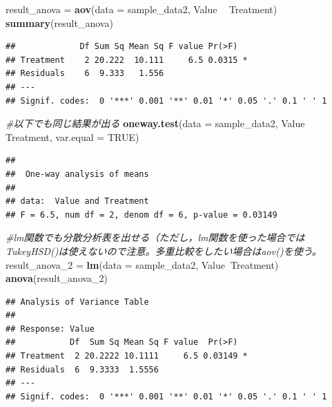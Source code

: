 \documentclass[]{article}
\newenvironment{Shaded}{\begin{snugshade}}{\end{snugshade}}
\newcommand{\KeywordTok}[1]{\textcolor[rgb]{0.13,0.29,0.53}{\textbf{#1}}}
\newcommand{\DataTypeTok}[1]{\textcolor[rgb]{0.13,0.29,0.53}{#1}}
\newcommand{\DecValTok}[1]{\textcolor[rgb]{0.00,0.00,0.81}{#1}}
\newcommand{\StringTok}[1]{\textcolor[rgb]{0.31,0.60,0.02}{#1}}
\newcommand{\CommentTok}[1]{\textcolor[rgb]{0.56,0.35,0.01}{\textit{#1}}}
\newcommand{\OtherTok}[1]{\textcolor[rgb]{0.56,0.35,0.01}{#1}}
\newcommand{\OperatorTok}[1]{\textcolor[rgb]{0.81,0.36,0.00}{\textbf{#1}}}
\newcommand{\NormalTok}[1]{#1}
\begin{document}
\begin{Shaded}
\begin{Highlighting}[]
\NormalTok{result_anova =}\StringTok{ }\KeywordTok{aov}\NormalTok{(}\DataTypeTok{data =}\NormalTok{ sample_data2, Value }\OperatorTok{~}\StringTok{ }\NormalTok{Treatment)}
\KeywordTok{summary}\NormalTok{(result_anova)}
\end{Highlighting}
\end{Shaded}

\begin{verbatim}
##             Df Sum Sq Mean Sq F value Pr(>F)  
## Treatment    2 20.222  10.111     6.5 0.0315 *
## Residuals    6  9.333   1.556                 
## ---
## Signif. codes:  0 '***' 0.001 '**' 0.01 '*' 0.05 '.' 0.1 ' ' 1
\end{verbatim}

\begin{Shaded}
\begin{Highlighting}[]
\CommentTok{#以下でも同じ結果が出る}
\KeywordTok{oneway.test}\NormalTok{(}\DataTypeTok{data =}\NormalTok{ sample_data2, Value }\OperatorTok{~}\StringTok{ }\NormalTok{Treatment, }\DataTypeTok{var.equal =} \OtherTok{TRUE}\NormalTok{)}
\end{Highlighting}
\end{Shaded}

\begin{verbatim}
## 
##  One-way analysis of means
## 
## data:  Value and Treatment
## F = 6.5, num df = 2, denom df = 6, p-value = 0.03149
\end{verbatim}

\begin{Shaded}
\begin{Highlighting}[]
\CommentTok{#lm関数でも分散分析表を出せる（ただし，lm関数を使った場合ではTukeyHSD()は使えないので注意。多重比較をしたい場合はaov()を使う。}
\NormalTok{result_anova_}\DecValTok{2}\NormalTok{ =}\StringTok{ }\KeywordTok{lm}\NormalTok{(}\DataTypeTok{data =}\NormalTok{ sample_data2, Value}\OperatorTok{~}\NormalTok{Treatment)}
\KeywordTok{anova}\NormalTok{(result_anova_}\DecValTok{2}\NormalTok{)}
\end{Highlighting}
\end{Shaded}

\begin{verbatim}
## Analysis of Variance Table
## 
## Response: Value
##           Df  Sum Sq Mean Sq F value  Pr(>F)  
## Treatment  2 20.2222 10.1111     6.5 0.03149 *
## Residuals  6  9.3333  1.5556                  
## ---
## Signif. codes:  0 '***' 0.001 '**' 0.01 '*' 0.05 '.' 0.1 ' ' 1
\end{verbatim}
\end{document}
